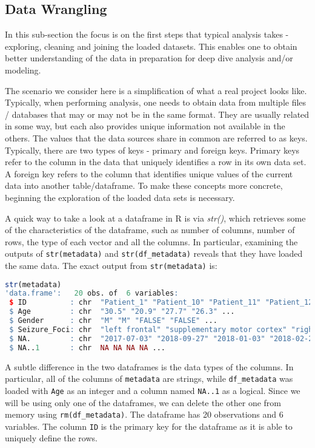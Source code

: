 \subsection{Data Wrangling}
In this sub-section the focus is on the first steps that typical analysis takes - exploring, cleaning and joining the loaded datasets. This enables one to obtain better understanding of the data in preparation for deep dive analysis and/or modeling.

The scenario we consider here is a simplification of what a real project looks like. Typically, when performing analysis, one needs to obtain data from multiple files / databases that may or may not be in the same format. They are usually related in some way, but each also provides unique information not available in the others. The values that the data sources share in common are referred to as keys. Typically, there are two types of keys - primary and foreign keys. Primary keys refer to the column in the data that uniquely identifies a row in its own data set. A foreign key refers to the column that identifies unique values of the current data into another table/dataframe. To make these concepts more concrete, beginning the exploration of the loaded data sets is necessary.

A quick way to take a look at a dataframe in R is via \textit{str()}, which retrieves some of the characteristics of the dataframe, such as number of columns, number of rows, the type of each vector and all the columns. In particular, examining the outputs of \verb|str(metadata)| and \verb|str(df_metadata)| reveals that they have loaded the same data. The exact output from \verb|str(metadata)| is:
\begin{lstlisting}[language=R]
str(metadata)
'data.frame':	20 obs. of  6 variables:
 $ ID          : chr  "Patient_1" "Patient_10" "Patient_11" "Patient_12" ...
 $ Age         : chr  "30.5" "20.9" "27.7" "26.3" ...
 $ Gender      : chr  "M" "M" "FALSE" "FALSE" ...
 $ Seizure_Foci: chr  "left frontal" "supplementary motor cortex" "right hippocampus" "left parietal" ...
 $ NA.         : chr  "2017-07-03" "2018-09-27" "2018-01-03" "2018-02-26" ...
 $ NA..1       : chr  NA NA NA NA ...
\end{lstlisting}
A subtle difference in the two dataframes is the data types of the columns. In particular, all of the columns of \verb|metadata| are strings, while \verb|df_metadata| was loaded with \verb|Age| as an integer and a column named \verb|NA..1| as a logical. Since we will be using only one of the dataframes, we can delete the other one from memory using \verb|rm(df_metadata)|. The dataframe has 20 observations and 6 variables. The column \verb|ID| is the primary key for the dataframe as it is able to uniquely define the rows.

